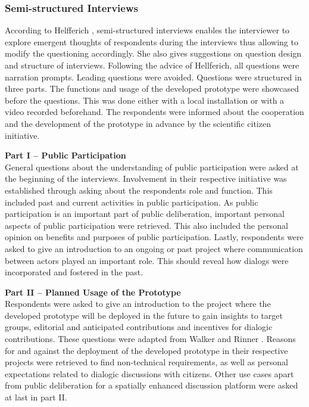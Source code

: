 \subsubsection{Semi-structured Interviews}
According to Helfferich \cite{helfferich2005}, semi-structured interviews enables the interviewer to explore emergent thoughts of respondents during the interviews thus allowing to modify the questioning accordingly. She also gives suggestions on question design and structure of interviews. Following the advice of Hellferich, all questions were narration prompts. Leading questions were avoided. Questions were structured in three parts. The functions and usage of the developed prototype were showcased before the questions. This was done either with a local installation or with a video recorded beforehand. The respondents were informed about the cooperation and the development of the prototype in advance by the scientific citizen initiative.

\textbf{Part I -- Public Participation}\\
General questions about the understanding of public participation were asked at the beginning of the interviews. Involvement in their respective initiative was established through asking about the respondents role and function. This included past and current activities in public participation. As public participation is an important part of public deliberation, important personal aspects of public participation were retrieved. This also included the personal opinion on benefits and purposes of public participation. Lastly, respondents were asked to give an introduction to an ongoing or past project where communication between actors played an important role. This should reveal how dialogs were incorporated and fostered in the past.

\textbf{Part II -- Planned Usage of the Prototype}\\
Respondents were asked to give an introduction to the project where the developed prototype will be deployed in the future to gain insights to target groups, editorial and anticipated contributions and incentives for dialogic contributions. These questions were adapted from Walker and Rinner \cite{Walker2013Qualitative}. Reasons for and against the deployment of the developed prototype in their respective projects were retrieved to find non-technical requirements, as well as personal expectations related to dialogic discussions with citizens. Other use cases apart from public deliberation for a spatially enhanced discussion platform were asked at last in part II.

